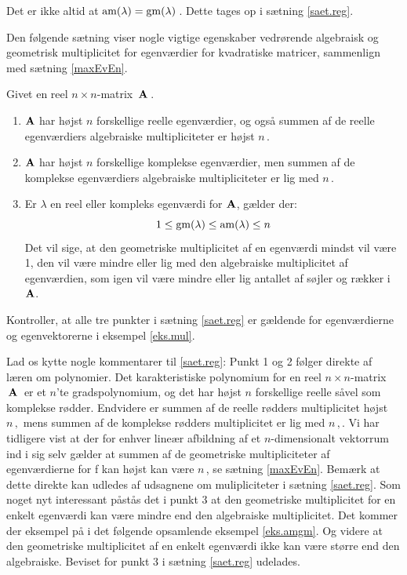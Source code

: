 \begin{obs}
Det er ikke altid at $ \mathrm{am}(\lambda) = \mathrm{gm}(\lambda)\, $. Dette tages op i sætning \ref{saet.reg}.
\end{obs}

Den følgende sætning viser nogle vigtige egenskaber vedrørende algebraisk og geometrisk multiplicitet for egenværdier for kvadratiske matricer, sammenlign med sætning \ref{maxEvEn}.

\begin{theorem} \label{saet.reg}
Givet en reel $n \times n$-matrix $\,\mathbf{A}\,$.
\begin{enumerate}
\item $ \mathbf{A} $ har højst $ n $ forskellige reelle egenværdier, og også summen af de reelle egenværdiers algebraiske multipliciteter er højst $ n\, $.
\item $ \mathbf{A} $ har højst $ n $ forskellige komplekse egenværdier, men summen af de komplekse egenværdiers algebraiske multipliciteter er lig med $ n\, $.

\item Er $ \lambda $ en reel eller kompleks egenværdi for $ \mathbf{A} $, gælder der: 
\begin{equation}
1 \leq \mathrm{gm}(\lambda) \leq \mathrm{am}(\lambda) \leq n
\end{equation}
Det vil sige, at den geometriske multiplicitet af en egenværdi mindst vil være 1, den vil være mindre eller lig med den algebraiske multiplicitet af egenværdien, som igen vil være mindre eller lig antallet af søjler og rækker i $ \mathbf{A} $.
\end{enumerate}
\end{theorem}

\begin{exercise}
Kontroller, at alle tre punkter i sætning \ref{saet.reg} er gældende for egenværdierne og egenvektorerne i eksempel \ref{eks.mul}.
\end{exercise}

Lad os kytte nogle kommentarer til \ref{saet.reg}:\bs
Punkt 1 og 2 følger direkte af læren om polynomier. Det karakteristiske polynomium for en reel $n \times n$-matrix $\,\mathbf{A}\,$ er et $ n $'te gradspolynomium, og det har højst $ n $ forskellige reelle såvel som komplekse rødder. Endvidere er summen af de reelle rødders multiplicitet højst $n\,,$ mens summen af de komplekse rødders multiplicitet er lig med $n\,,$. \bs
Vi har tidligere vist at der for enhver lineær afbildning af et $n$-dimensionalt vektorrum ind i sig selv gælder at summen af de geometriske multipliciteter af egenværdierne for f kan højst kan være $n\,$, se sætning \ref{maxEvEn}. Bemærk at dette direkte kan udledes af udsagnene om mulipliciteter i sætning \ref{saet.reg}.\bs
Som noget nyt interessant påstås det i punkt 3 at den geometriske multiplicitet for en enkelt egenværdi kan være mindre end den algebraiske multiplicitet. Det kommer der eksempel på i det følgende opsamlende eksempel \ref{eks.amgm}. Og videre at den  geometriske multiplicitet af en enkelt egenværdi ikke kan være større end den algebraiske. Beviset for punkt 3 i sætning \ref{saet.reg} udelades. 

